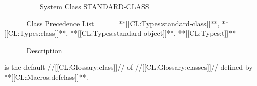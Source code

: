 ====== System Class STANDARD-CLASS ======

====Class Precedence List==== **[[CL:Types:standard-class]]**, **[[CL:Types:class]]**, **[[CL:Types:standard-object]]**, **[[CL:Types:t]]**

====Description====

 is the default //[[CL:Glossary:class]]// of //[[CL:Glossary:classes]]// defined by **[[CL:Macros:defclass]]**.

